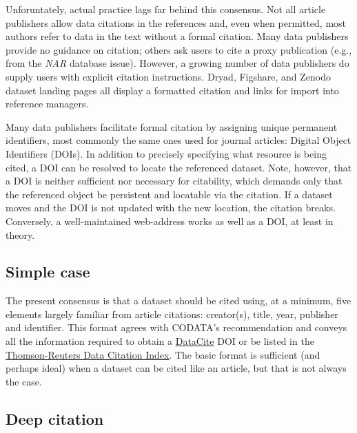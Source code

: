\documentclass[10pt,a4paper,twocolumn]{article}
\begin{document}
{Unforuntately, actual practice lags far behind this consensus.
Not all article publishers allow data citations in the references and, even when permitted, most authors refer to data in the text without a formal citation\cite{mooney_anatomy_2011}.
Many data publishers provide no guidance on citation; others ask users to cite a proxy publication (e.g., from the \emph{NAR} database issue).
However, a growing number of data publishers do supply users with explicit citation instructions.
Dryad, Figshare, and Zenodo dataset landing pages all display a formatted citation and links for import into reference managers.

Many data publishers facilitate formal citation by assigning unique permanent identifiers, most commonly the same ones used for journal articles: Digital Object Identifiers (DOIs).
In addition to precisely specifying what resource is being cited, a DOI can be resolved to locate the referenced dataset.
Note, however, that a DOI is neither sufficient nor necessary for citability, which demands only that the referenced object be persistent and locatable via the citation.
If a dataset moves and the DOI is not updated with the new location, the citation breaks.
Conversely, a well-maintained web-address works as well as a DOI, at least in theory.

\subsection*{Simple case}\label{simple-case}

The present consensus is that a dataset should be cited using, at a minimum, five elements largely familiar from article citations: creator(s), title, year, publisher and identifier.
This format agrees with CODATA's recommendation\cite{codata-icsti_task_group_on_data_citation_standards_and_practices_out_2013} and conveys all the information required to obtain a \href{http://www.datacite.org/}{DataCite} DOI\cite{starr_iscitedby:_2011} or be listed in the \href{http://thomsonreuters.com/data-citation-index/}{Thomson-Reuters Data Citation Index}.
The basic format is sufficient (and perhaps ideal) when a dataset can be cited like an article, but that is not always the case.

\subsection*{Deep citation}\label{deep-citation}

}
\end{document}
